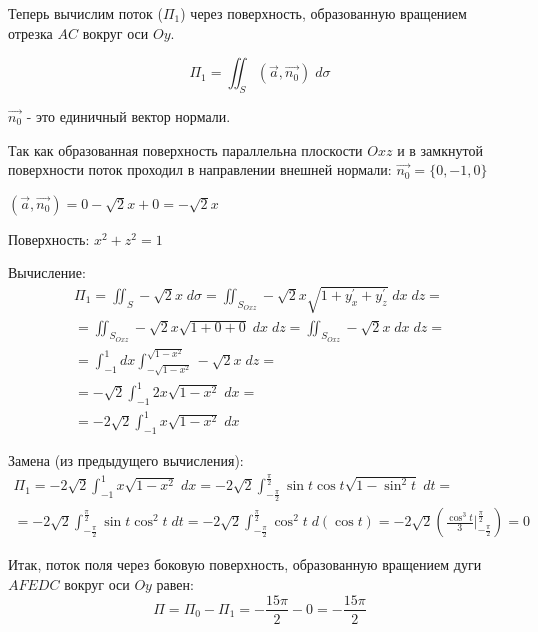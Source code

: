 \begin{enumerate}
    Теперь вычислим поток ($\Pi_{1}$) через поверхность, образованную вращением отрезка $AC$ вокруг оси $Oy$.

    \begin{equation*}
        \Pi_{1} = \iint_{S} (\Vec{a}, \Vec{n_{0}})\; d\sigma
    \end{equation*}

    $\Vec{n_{0}}$ - это единичный вектор нормали.

    Так как образованная поверхность  параллельна плоскости $Oxz$ и в замкнутой поверхности поток проходил в направлении внешней нормали: $\Vec{n_{0}} = \{0,-1,0\}$

    $(\Vec{a}, \Vec{n_{0}}) = 0 - \sqrt{2}x + 0 = -\sqrt{2}x$

    Поверхность: $x^2 + z^2 = 1$

    Вычисление:
    \begin{align*}
        \Pi_{1} = \iint_{S} -\sqrt{2}x\; d\sigma = \iint_{S_{Oxz}} -\sqrt{2}x  \sqrt{1 + y_{x}^\prime + y_{z}^\prime}\; dx\;dz
        =\\=
        \iint_{S_{Oxz}} -\sqrt{2}x \sqrt{1 + 0 + 0}\; dx\;dz = \iint_{S_{Oxz}} -\sqrt{2}x \;dx\;dz
        =\\=
        \int_{-1}^{1}dx\int_{-\sqrt{1-x^2}}^{\sqrt{1-x^2}} -\sqrt{2}x \;dz
        =\\=
        -\sqrt{2}\int_{-1}^{1}2x\sqrt{1-x^2}\;dx
        =\\=
        -2\sqrt{2}\int_{-1}^{1}x\sqrt{1-x^2}\;dx
    \end{align*}

    Замена (из предыдущего вычисления):
    \begin{align*}
        \Pi_{1} = -2\sqrt{2}\int_{-1}^{1}x\sqrt{1-x^2}\;dx = -2\sqrt{2}\int_{-\frac{\pi}{2}}^{\frac{\pi}{2}}\sin{t}\cos{t}\sqrt{1-\sin^2{t}}\;dt
        =\\=
        -2\sqrt{2}\int_{-\frac{\pi}{2}}^{\frac{\pi}{2}}\sin{t}\cos^2{t}\;dt
        = -2\sqrt{2}\int_{-\frac{\pi}{2}}^{\frac{\pi}{2}}\cos^2{t}\;d(\cos{t}) = -2\sqrt{2} \left(\frac{\cos^3{t}}{3}\biggr|_{-\frac{\pi}{2}}^{\frac{\pi}{2}} \right) = 0
    \end{align*}

    Итак, поток поля через боковую поверхность, образованную вращением дуги $AFEDC$ вокруг оси $Oy$ равен:
    \begin{equation*}
        \Pi = \Pi_{0} - \Pi_{1} = -\frac{15\pi}{2} - 0 = -\frac{15\pi}{2}
    \end{equation*}
\end{enumerate}
